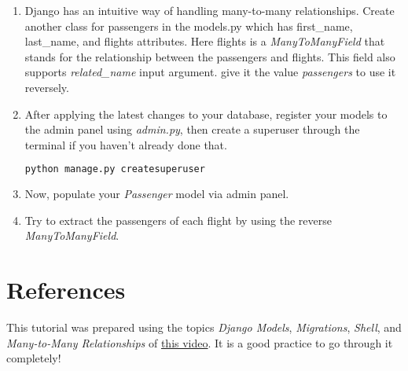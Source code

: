 \documentclass{homework}
\begin{document}
\begin{enumerate}[label=\roman*)]
    \item Django has an intuitive way of handling many-to-many relationships. Create another class for passengers in the models.py which has first\_name, last\_name, and flights attributes. Here flights is a \textit{ManyToManyField} that stands for the relationship between the passengers and flights. This field also supports \textit{related\_name} input argument. give it the value \textit{passengers} to use it reversely.

    \item After applying the latest changes to your database, register your models to the admin panel using \textit{admin.py}, then create a superuser through the terminal if you haven't already done that.
    \begin{lstlisting}[language=bash]
        python manage.py createsuperuser
\end{lstlisting}
    \item Now, populate your \textit{Passenger} model via admin panel.
    \item Try to extract the passengers of each flight by using the reverse \textit{ManyToManyField}.
\end{enumerate}

\section*{References}
This tutorial was prepared using the topics \textit{Django Models}, \textit{Migrations}, \textit{Shell}, and \textit{Many-to-Many Relationships} of
\href{https://cs50.harvard.edu/web/2020/weeks/4/}{this video}. It is a good practice to go through it completely!
\end{document}

